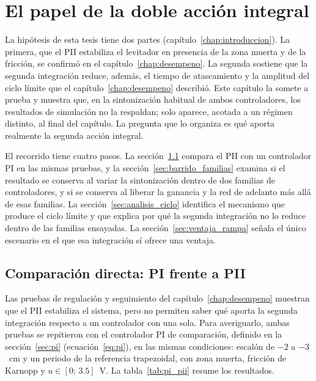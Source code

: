 \chapter{El papel de la doble acción integral}\label{chap:doble_integral}

La hipótesis de esta tesis tiene dos partes (capítulo~\ref{chap:introduccion}). La primera, que el PII estabiliza el levitador en presencia de la zona muerta y de la fricción, se confirmó en el capítulo~\ref{chap:desempeno}. La segunda sostiene que la segunda integración reduce, además, el tiempo de atascamiento y la amplitud del ciclo límite que el capítulo~\ref{chap:desempeno} describió. Este capítulo la somete a prueba y muestra que, en la sintonización habitual de ambos controladores, los resultados de simulación no la respaldan; solo aparece, acotada a un régimen distinto, al final del capítulo. La pregunta que lo organiza es qué aporta realmente la segunda acción integral.

El recorrido tiene cuatro pasos. La sección~\ref{sec:pi_pii} compara el PII con un controlador PI en las mismas pruebas, y la sección~\ref{sec:barrido_familias} examina si el resultado se conserva al variar la sintonización dentro de dos familias de controladores, y si se conserva al liberar la ganancia y la red de adelanto más allá de esas familias. La sección~\ref{sec:analisis_ciclo} identifica el mecanismo que produce el ciclo límite y que explica por qué la segunda integración no lo reduce dentro de las familias ensayadas. La sección~\ref{sec:ventaja_rampa} señala el único escenario en el que esa integración sí ofrece una ventaja.

\section{Comparación directa: PI frente a PII}\label{sec:pi_pii}

Las pruebas de regulación y seguimiento del capítulo~\ref{chap:desempeno} muestran que el PII estabiliza el sistema, pero no permiten saber qué aporta la segunda integración respecto a un controlador con una sola. Para averiguarlo, ambas pruebas se repitieron con el controlador PI de comparación, definido en la sección~\ref{sec:pi} (ecuación~\eqref{eq:pi}), en las mismas condiciones: escalón de $-2$ a $-3$~cm y un periodo de la referencia trapezoidal, con zona muerta, fricción de Karnopp y $u\in[0;\,3.5]$~V. La tabla~\ref{tab:pi_pii} resume los resultados.

